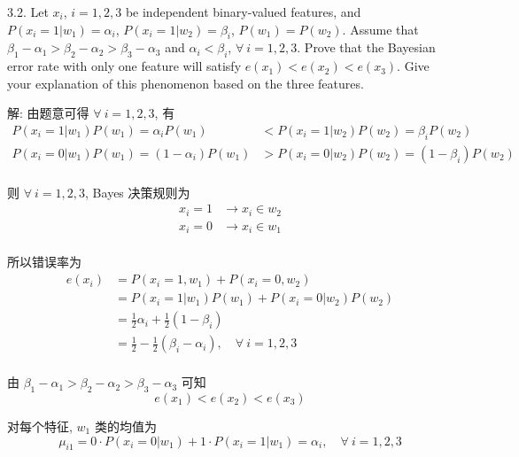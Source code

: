 \documentclass{article}
\begin{document}
3.2. Let $x_{i}$, $i=1, 2, 3$ be independent binary-valued features, and $P(x_{i}=1|w_{1})=\alpha_{i}$, $P(x_{i}=1|w_{2})=\beta_{i}$, $P(w_{1})=P(w_{2})$. Assume that $\beta_{1}-\alpha_{1}>\beta_{2}-\alpha_{2}>\beta_{3}-\alpha_{3}$ and $\alpha_{i}<\beta_{i}$, $\forall~i=1, 2, 3$. Prove that the Bayesian error rate with only one feature will satisfy $e(x_{1})<e(x_{2})<e(x_{3})$. Give your explanation of this phenomenon based on the three features.

解: 由题意可得 $\forall~i=1,2,3$, 有
\begin{equation}
  \begin{aligned}
    P(x_{i}=1|w_{1})P(w_{1})=\alpha_iP(w_{1})&<P(x_{i}=1|w_{2})P(w_{2})=\beta_iP(w_{2})\\
    P(x_{i}=0|w_{1})P(w_{1})=(1-\alpha_i)P(w_{1})&>P(x_{i}=0|w_{2})P(w_{2})=(1-\beta_i)P(w_{2})\\
  \end{aligned}
\end{equation}

则 $\forall~i=1,2,3$, Bayes 决策规则为 
\begin{equation}
  \begin{aligned}
    x_i=1&\to x_i\in w_2\\
    x_i=0&\to x_i\in w_1\\
  \end{aligned}
\end{equation}

所以错误率为
\begin{equation}
  \begin{aligned}
    e(x_i)
    &=P(x_i=1,w_1)+P(x_i=0,w_2)\\
    &=P(x_i=1|w_1)P(w_1)+P(x_i=0|w_2)P(w_2)\\
    &=\frac{1}{2}\alpha_i+\frac{1}{2}(1-\beta_i)\\
    &=\frac{1}{2}-\frac{1}{2}(\beta_i-\alpha_i),\quad\forall~i=1,2,3\\
  \end{aligned}
\end{equation}

由 $\beta_{1}-\alpha_{1}>\beta_{2}-\alpha_{2}>\beta_{3}-\alpha_{3}$ 可知
\begin{equation}
  e(x_{1})<e(x_{2})<e(x_{3})
\end{equation}

对每个特征, $w_1$ 类的均值为
\begin{equation}
  \mu_{i1}=0\cdot P(x_i=0|w_1)+1\cdot P(x_i=1|w_1)=\alpha_i,\quad\forall~i=1,2,3
\end{equation}
\end{document}
